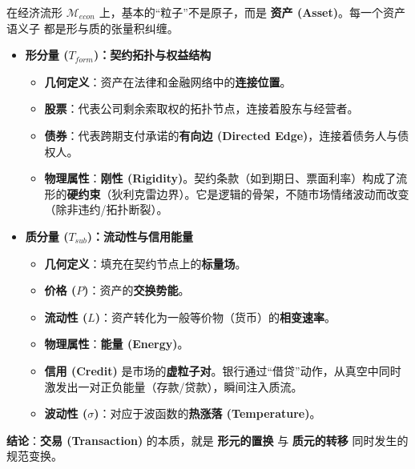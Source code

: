 在经济流形 $\mathcal{M}_{econ}$ 上，基本的“粒子”不是原子，而是 \textbf{资产 (Asset)}。每一个资产 语义子 都是形与质的张量积纠缠。
\begin{itemize}
    \item \textbf{\textcolor{structurecolor}{形分量 ($T_{form}$)：契约拓扑与权益结构}}
    \begin{itemize}
        \item   \textbf{几何定义}：资产在法律和金融网络中的\textbf{连接位置}。
        \item   \textbf{股票}：代表公司剩余索取权的拓扑节点，连接着股东与经营者。
        \item   \textbf{债券}：代表跨期支付承诺的\textbf{有向边 (Directed Edge)}，连接着债务人与债权人。
        \item   \textbf{物理属性}：\textbf{刚性 (Rigidity)}。契约条款（如到期日、票面利率）构成了流形的\textbf{硬约束}（狄利克雷边界）。它是逻辑的骨架，不随市场情绪波动而改变（除非违约/拓扑断裂）。
    \end{itemize}

    \item \textbf{\textcolor{structurecolor}{质分量 ($T_{sub}$)：流动性与信用能量}}
    \begin{itemize}
        \item   \textbf{几何定义}：填充在契约节点上的\textbf{标量场}。
        \item   \textbf{价格 ($P$)}：资产的\textbf{交换势能}。
        \item   \textbf{流动性 ($L$)}：资产转化为一般等价物（货币）的\textbf{相变速率}。
        \item   \textbf{物理属性}：\textbf{能量 (Energy)}。
        \item   \textbf{信用 (Credit)} 是市场的\textbf{虚粒子对}。银行通过“借贷”动作，从真空中同时激发出一对正负能量（存款/贷款），瞬间注入质流。
        \item   \textbf{波动性 ($\sigma$)}：对应于波函数的\textbf{热涨落 (Temperature)}。
    \end{itemize}
\end{itemize}
\textbf{结论}：\textbf{交易 (Transaction)} 的本质，就是 \textbf{形元的置换} 与 \textbf{质元的转移} 同时发生的规范变换。




